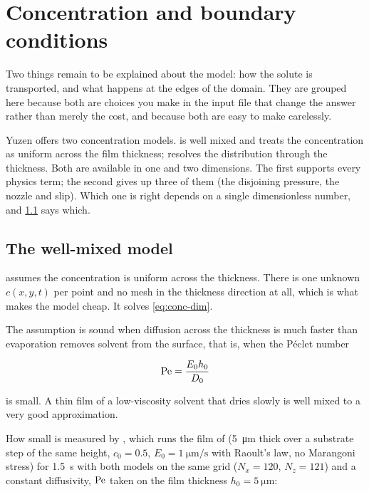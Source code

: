 \chapter{Concentration and boundary conditions}
\label{ch:concentration}

Two things remain to be explained about the model: how the solute is
transported, and what happens at the edges of the domain. They are grouped here
because both are choices you make in the input file that change the answer
rather than merely the cost, and because both are easy to make carelessly.

Yuzen offers two concentration models.  is well mixed and treats the
concentration as uniform across the film thickness;  resolves the
distribution through the thickness. Both are available in one and two
dimensions. The first supports every physics term; the second gives up three of
them (the disjoining pressure, the nozzle and slip). Which one is right
depends on a single dimensionless number, and \cref{sec:conc:wm} says which.

\section{The well-mixed model}
\label{sec:conc:wm}

 assumes the concentration is uniform
across the thickness. There is one unknown $c(x,y,t)$ per point and no mesh in
the thickness direction at all, which is what makes the model cheap. It solves
\cref{eq:conc-dim}.

The assumption is sound when diffusion across the thickness is much faster than
evaporation removes solvent from the surface, that is, when the P\'eclet number

\[
  \mathrm{Pe} = \frac{E_0 h_0}{D_0}
\]

is small. A thin film of a low-viscosity solvent that dries slowly is well
mixed to a very good approximation.

How small is measured by , which runs the
film of  (\SI{5}{\micro\metre} thick over a substrate step
of the same height, $c_0 = 0.5$,
$E_0 = \SI{1}{\micro\metre\per\second}$ with Raoult's law, no Marangoni stress)
for \SI{1.5}{\second} with both models on the same grid ($N_x = 120$,
$N_z = 121$) and a constant diffusivity, $\mathrm{Pe}$ taken on the film thickness
$h_0 = \SI{5}{\micro\metre}$:

